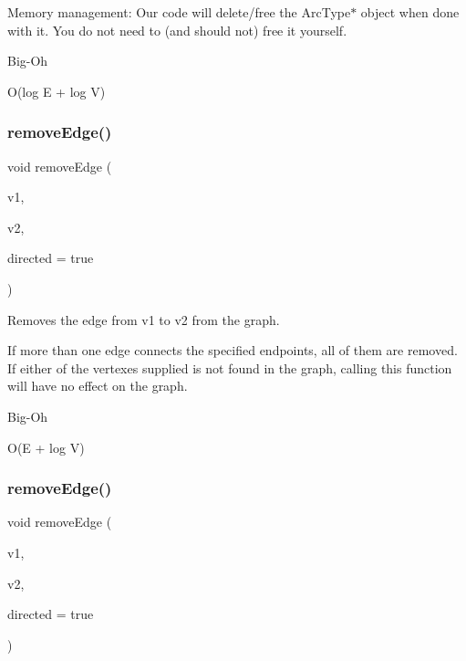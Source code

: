 Memory management\+: Our code will delete/free the Arc\+Type$\ast$ object when done with it. You do not need to (and should not) free it yourself. \begin{DoxyRefDesc}{Big-\/\+Oh}
\item[\mbox{\hyperlink{BigOh__BigOh000086}{Big-\/\+Oh}}]O(log E + log V) \end{DoxyRefDesc}
\mbox{\label{classBasicGraphGen_adfee7a20d0c13cc515b3b7e951d8baf2}} 
\subsubsection{\texorpdfstring{remove\+Edge()}{removeEdge()}\hspace{0.1cm}{\footnotesize\ttfamily [1/3]}}
{\footnotesize\ttfamily void remove\+Edge (\begin{DoxyParamCaption}\item[{const std\+::string \&}]{v1,  }\item[{const std\+::string \&}]{v2,  }\item[{bool}]{directed = {\ttfamily true} }\end{DoxyParamCaption})}



Removes the edge from v1 to v2 from the graph. 

If more than one edge connects the specified endpoints, all of them are removed. If either of the vertexes supplied is not found in the graph, calling this function will have no effect on the graph. \begin{DoxyRefDesc}{Big-\/\+Oh}
\item[\mbox{\hyperlink{BigOh__BigOh000029}{Big-\/\+Oh}}]O(E + log V) \end{DoxyRefDesc}
\mbox{\label{classBasicGraphGen_a8b1003fbe63fab20173526459fff4139}} 
\subsubsection{\texorpdfstring{remove\+Edge()}{removeEdge()}\hspace{0.1cm}{\footnotesize\ttfamily [2/3]}}
{\footnotesize\ttfamily void remove\+Edge (\begin{DoxyParamCaption}\item[{\mbox{\hyperlink{classVertexGen}{Vertex\+Gen}}$<$ V, E $>$ $\ast$}]{v1,  }\item[{\mbox{\hyperlink{classVertexGen}{Vertex\+Gen}}$<$ V, E $>$ $\ast$}]{v2,  }\item[{bool}]{directed = {\ttfamily true} }\end{DoxyParamCaption})}



